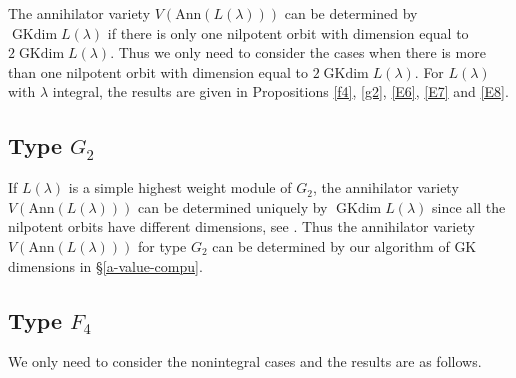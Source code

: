 \documentclass[reqno,12pt]{amsart}
\numberwithin{equation}{section}
\theoremstyle{plain}
\theoremstyle{definition}
\newcommand{\lam}{\lambda}
\newcommand{\Ann}{\mathrm{Ann}}
\newcommand{\gkd}{\operatorname{GKdim}}
\begin{document}
The annihilator variety $V(\Ann(L(\lam)))$ can be determined by $\gkd L(\lam)$ if there is only one nilpotent orbit with dimension equal to $2\gkd L(\lam)$. Thus we only need to consider the cases when there is more than one nilpotent orbit with dimension equal to $2\gkd L(\lam)$.
For $L(\lam)$ with $\lambda$ integral, the results are given 
 in Propositions \ref{f4}, \ref{g2}, \ref{E6}, \ref{E7} and \ref{E8}. 
 
\subsection{Type \texorpdfstring{$G_2$}{}}
 
 If $L(\lam)$ is a simple  highest weight module of $G_2$, the annihilator variety $V(\Ann(L(\lam)))$ can be determined uniquely by $\gkd L(\lam)$ since all the nilpotent orbits have different dimensions, see \cite[\S 8.4]{CM}. Thus the annihilator variety $V(\Ann(L(\lam)))$ for type $G_2$ can be determined by our algorithm of GK dimensions in \S \ref{a-value-compu}.


\subsection{Type \texorpdfstring{$F_4$}{}}
 We only need to consider the nonintegral cases and the results are as follows.
\end{document}
